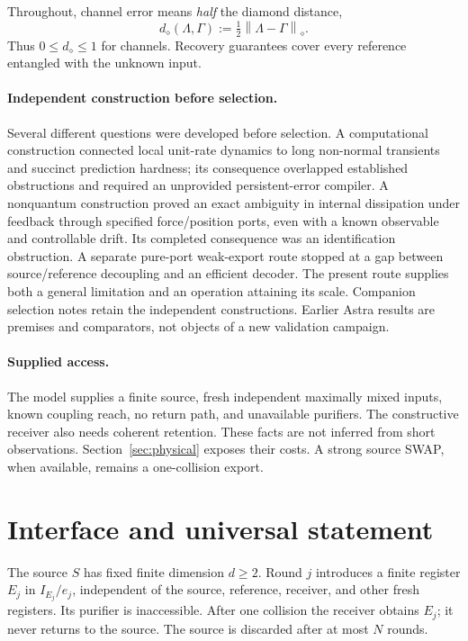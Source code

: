 \documentclass[11pt]{article}
\numberwithin{equation}{section}
\theoremstyle{remark}
\newcommand{\norm}[1]{\left\lVert#1\right\rVert}
\begin{document}
Throughout, channel error means \emph{half} the diamond distance,
\begin{equation}
 d_\diamond(\Lambda,\Gamma):=\tfrac12\norm{\Lambda-\Gamma}_{\diamond}.
 \label{eq:convention}
\end{equation}
Thus \(0\le d_\diamond\le1\) for channels. Recovery guarantees cover every
reference entangled with the unknown input.

\paragraph{Independent construction before selection.}
Several different questions were developed before selection. A computational
construction connected local unit-rate dynamics to long non-normal
transients and succinct prediction hardness; its consequence overlapped
established obstructions and required an unprovided persistent-error
compiler. A nonquantum construction proved an exact ambiguity in internal
dissipation under feedback through specified force/position ports, even with
a known observable and controllable drift. Its completed consequence was an
identification obstruction. A separate pure-port weak-export route stopped
at a gap between source/reference decoupling and an efficient decoder.
The present route supplies both a general
limitation and an operation attaining its scale. Companion selection notes
retain the independent constructions. Earlier Astra results are premises
and comparators, not objects of a new validation campaign.

\paragraph{Supplied access.}
The model supplies a finite source, fresh independent maximally mixed inputs,
known coupling reach, no return path, and unavailable purifiers. The
constructive receiver also needs coherent retention. These facts are not
inferred from short observations. Section~\ref{sec:physical} exposes their
costs. A strong source SWAP, when available, remains a one-collision export.

\section{Interface and universal statement}
\label{sec:interface}
The source \(S\) has fixed finite dimension \(d\ge2\). Round \(j\) introduces
a finite register \(E_j\) in \(I_{E_j}/e_j\), independent of the source,
reference, receiver, and other fresh registers. Its purifier is inaccessible.
After one collision the receiver obtains \(E_j\); it never returns to the
source. The source is discarded after at most \(N\) rounds.
\end{document}
